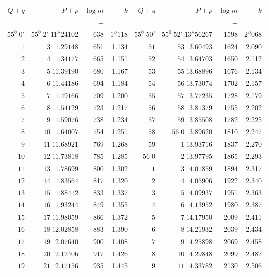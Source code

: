 \clearpage
{}
\begingroup
\fontsize{8}{9}\selectfont
\setlength{\tabcolsep}{3pt}
\renewcommand{\arraystretch}{1.08}
\begin{center}
\begin{tabular}{|r|r|r|r||r|r|r|r|}
\hline
\(Q+q\)&\(P+p\)&\(\log m\)&\(k\)&\(Q+q\)&\(P+p\)&\(\log m\)&\(k\)\\
&&\(-\)&&&&\(-\)&\\\hline
\(55^0\;0'\)&\(55^0\;2'\;11''24102\)&638&\(1''118\)&\(55^0\;50'\)&\(55^0\;52'\;13''56267\)&1598&\(2''068\)\\
\(1\)&\(3\;11.29148\)&651&1.134&\(51\)&\(53\;13.60493\)&1624&2.090\\
\(2\)&\(4\;11.34177\)&665&1.151&\(52\)&\(54\;13.64703\)&1650&2.112\\
\(3\)&\(5\;11.39190\)&680&1.167&\(53\)&\(55\;13.68896\)&1676&2.134\\
\(4\)&\(6\;11.44186\)&694&1.184&\(54\)&\(56\;13.73074\)&1702&2.157\\
\(5\)&\(7\;11.49166\)&709&1.200&\(55\)&\(57\;13.77235\)&1728&2.179\\
\(6\)&\(8\;11.54129\)&723&1.217&\(56\)&\(58\;13.81379\)&1755&2.202\\
\(7\)&\(9\;11.59076\)&738&1.234&\(57\)&\(59\;13.85508\)&1782&2.225\\
\(8\)&\(10\;11.64007\)&754&1.251&\(58\)&\(56\;0\;13.89620\)&1810&2.247\\
\(9\)&\(11\;11.68921\)&769&1.268&\(59\)&\(1\;13.93716\)&1837&2.270\\[3pt]
\(10\)&\(12\;11.73818\)&785&1.285&\(56\;0\)&\(2\;13.97795\)&1865&2.293\\
\(11\)&\(13\;11.78699\)&800&1.302&\(1\)&\(3\;14.01859\)&1894&2.317\\
\(12\)&\(14\;11.83564\)&817&1.320&\(2\)&\(4\;14.05906\)&1922&2.340\\
\(13\)&\(15\;11.88412\)&833&1.337&\(3\)&\(5\;14.09937\)&1951&2.363\\
\(14\)&\(16\;11.93244\)&849&1.355&\(4\)&\(6\;14.13952\)&1980&2.387\\
\(15\)&\(17\;11.98059\)&866&1.372&\(5\)&\(7\;14.17950\)&2009&2.411\\
\(16\)&\(18\;12.02858\)&883&1.390&\(6\)&\(8\;14.21932\)&2039&2.434\\
\(17\)&\(19\;12.07640\)&900&1.408&\(7\)&\(9\;14.25898\)&2069&2.458\\
\(18\)&\(20\;12.12406\)&917&1.426&\(8\)&\(10\;14.29848\)&2099&2.482\\
\(19\)&\(21\;12.17156\)&935&1.445&\(9\)&\(11\;14.33782\)&2130&2.506\\[3pt]

\end{tabular}
\end{center}
